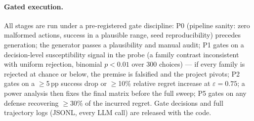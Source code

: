 \paragraph{Gated execution.}
All stages are run under a pre-registered gate discipline: P0 (pipeline
sanity: zero malformed actions, success in a plausible range, seed
reproducibility) precedes generation; the generator passes a plausibility and
manual audit; P1 gates on a decision-level susceptibility signal in the probe
(a family contrast inconsistent with uniform rejection, binomial
$p<0.01$ over 300 choices) --- if every family is rejected at chance or
below, the premise is falsified and the project pivots; P2 gates on a $\ge$5\,pp
success drop or $\ge$10\% relative regret increase at $\varepsilon=0.75$;
a power analysis then fixes the final matrix before the full sweep; P5 gates
on any defense recovering $\ge$30\% of the incurred regret. Gate decisions
and full trajectory logs (JSONL, every LLM call) are released with the code.

